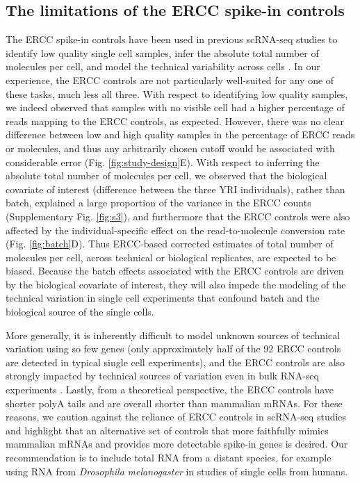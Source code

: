 \subsection{The limitations of the ERCC spike-in
controls}\label{the-limitations-of-the-ercc-spike-in-controls}

The ERCC spike-in controls have been used in previous scRNA-seq studies
to identify low quality single cell samples, infer the absolute total
number of molecules per cell, and model the technical variability across
cells \citep{Brennecke2013, Grun2014, Ding2015, Vallejos2015}. In our
experience, the ERCC controls are not particularly well-suited for any
one of these tasks, much less all three. With respect to identifying low
quality samples, we indeed observed that samples with no visible cell
had a higher percentage of reads mapping to the ERCC controls, as
expected. However, there was no clear difference between low and high
quality samples in the percentage of ERCC reads or molecules, and thus
any arbitrarily chosen cutoff would be associated with considerable
error (Fig. \ref{fig:study-design}E). With respect to inferring the absolute total number of
molecules per cell, we observed that the biological covariate of
interest (difference between the three YRI individuals), rather than
batch, explained a large proportion of the variance in the ERCC counts
(Supplementary Fig. \ref{fig:s3}), and furthermore that the ERCC controls were
also affected by the individual-specific effect on the read-to-molecule
conversion rate (Fig. \ref{fig:batch}D). Thus ERCC-based corrected estimates of total
number of molecules per cell, across technical or biological replicates,
are expected to be biased. Because the batch effects associated with the
ERCC controls are driven by the biological covariate of interest, they
will also impede the modeling of the technical variation in single cell
experiments that confound batch and the biological source of the single
cells.

More generally, it is inherently difficult to model unknown sources of
technical variation using so few genes \citep{Risso2014} (only
approximately half of the 92 ERCC controls are detected in typical
single cell experiments), and the ERCC controls are also strongly
impacted by technical sources of variation even in bulk RNA-seq
experiments \citep{SEQC/MAQC-IIIConsortium2014}. Lastly, from a
theoretical perspective, the ERCC controls have shorter polyA tails and
are overall shorter than mammalian mRNAs. For these reasons, we caution
against the reliance of ERCC controls in scRNA-seq studies and highlight
that an alternative set of controls that more faithfully mimics
mammalian mRNAs and provides more detectable spike-in genes is desired.
Our recommendation is to include total RNA from a distant species, for
example using RNA from \emph{Drosophila} \emph{melanogaster} in studies
of single cells from humans.

